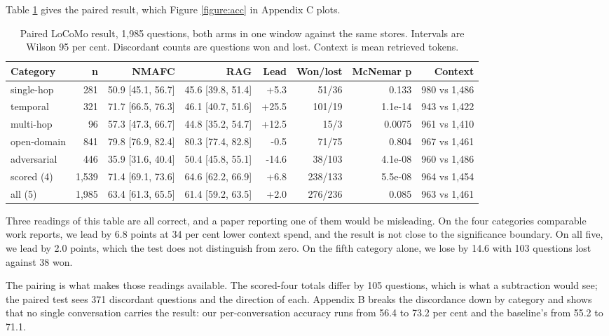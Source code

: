 \documentclass[10pt,a4paper,twocolumn]{article}
\begin{document}
Table \ref{table:main} gives the paired result, which Figure \ref{figure:acc} in Appendix C plots.

\begin{table}[tb]
\centering
\caption{Paired LoCoMo result, 1,985 questions, both arms in one window against the same stores. Intervals are Wilson 95 per cent. Discordant counts are questions won and lost. Context is mean retrieved tokens.}\label{table:main}
\scriptsize
\begin{tabular}{lrrrrrrr}
\toprule
Category & n & NMAFC & RAG & Lead & Won/lost & McNemar p & Context \\
\midrule
single-hop & 281 & 50.9 [45.1, 56.7] & 45.6 [39.8, 51.4] & +5.3 & 51/36 & 0.133 & 980 vs 1,486 \\
temporal & 321 & 71.7 [66.5, 76.3] & 46.1 [40.7, 51.6] & +25.5 & 101/19 & 1.1e-14 & 943 vs 1,422 \\
multi-hop & 96 & 57.3 [47.3, 66.7] & 44.8 [35.2, 54.7] & +12.5 & 15/3 & 0.0075 & 961 vs 1,410 \\
open-domain & 841 & 79.8 [76.9, 82.4] & 80.3 [77.4, 82.8] & -0.5 & 71/75 & 0.804 & 967 vs 1,461 \\
adversarial & 446 & 35.9 [31.6, 40.4] & 50.4 [45.8, 55.1] & -14.6 & 38/103 & 4.1e-08 & 960 vs 1,486 \\
scored (4) & 1,539 & 71.4 [69.1, 73.6] & 64.6 [62.2, 66.9] & +6.8 & 238/133 & 5.5e-08 & 964 vs 1,454 \\
all (5) & 1,985 & 63.4 [61.3, 65.5] & 61.4 [59.2, 63.5] & +2.0 & 276/236 & 0.085 & 963 vs 1,461 \\
\bottomrule
\end{tabular}
\end{table}

Three readings of this table are all correct, and a paper reporting one of them would be misleading. On the four categories comparable work reports, we lead by 6.8 points at 34 per cent lower context spend, and the result is not close to the significance boundary. On all five, we lead by 2.0 points, which the test does not distinguish from zero. On the fifth category alone, we lose by 14.6 with 103 questions lost against 38 won.

The pairing is what makes those readings available. The scored-four totals differ by 105 questions, which is what a subtraction would see; the paired test sees 371 discordant questions and the direction of each. Appendix B breaks the discordance down by category and shows that no single conversation carries the result: our per-conversation accuracy runs from 56.4 to 73.2 per cent and the baseline's from 55.2 to 71.1.
\end{document}
